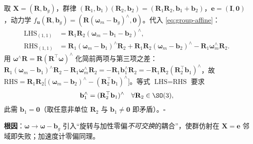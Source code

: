 \begin{derivation}
\label{deriv:bias-negative}
取 $\mathbf{X}=(\mathbf{R},\mathbf{b}_g)$，群律 $(\mathbf{R}_1,\mathbf{b}_1)(\mathbf{R}_2,\mathbf{b}_2)=(\mathbf{R}_1\mathbf{R}_2,\mathbf{b}_1+\mathbf{b}_2)$，$\mathbf{e}=(\mathbf{I},\mathbf{0})$，动力学 $f_{\mathbf{u}}(\mathbf{R},\mathbf{b}_g)=(\mathbf{R}(\boldsymbol{\omega}_m-\mathbf{b}_g)^\wedge,\mathbf{0})$。代入 \cref{eq:group-affine}：
\begin{align*}
  \text{LHS}_{(1,1)}&=\mathbf{R}_1\mathbf{R}_2(\boldsymbol{\omega}_m-\mathbf{b}_1-\mathbf{b}_2)^\wedge,\\
  \text{RHS}_{(1,1)}&=\mathbf{R}_1(\boldsymbol{\omega}_m-\mathbf{b}_1)^\wedge\mathbf{R}_2+\mathbf{R}_1\mathbf{R}_2(\boldsymbol{\omega}_m-\mathbf{b}_2)^\wedge-\mathbf{R}_1\boldsymbol{\omega}_m^\wedge\mathbf{R}_2.
\end{align*}
用 $\boldsymbol{\omega}^\wedge\mathbf{R}=\mathbf{R}(\mathbf{R}^\top\boldsymbol{\omega})^\wedge$ 化简前两项与第三项之差：$\mathbf{R}_1(\boldsymbol{\omega}_m-\mathbf{b}_1)^\wedge\mathbf{R}_2-\mathbf{R}_1\boldsymbol{\omega}_m^\wedge\mathbf{R}_2=-\mathbf{R}_1\mathbf{b}_1^\wedge\mathbf{R}_2=-\mathbf{R}_1\mathbf{R}_2(\mathbf{R}_2^\top\mathbf{b}_1)^\wedge$，故 $\text{RHS}=\mathbf{R}_1\mathbf{R}_2\big[(\boldsymbol{\omega}_m-\mathbf{b}_2)^\wedge-(\mathbf{R}_2^\top\mathbf{b}_1)^\wedge\big]$。等式 $\text{LHS}=\text{RHS}$ 要求
\begin{equation}
  \mathbf{b}_1^\wedge=(\mathbf{R}_2^\top\mathbf{b}_1)^\wedge\quad\forall\mathbf{R}_2\in\SO(3),
  \label{eq:bias-contradiction}
\end{equation}
此需 $\mathbf{b}_1=\mathbf{0}$（取任意非单位 $\mathbf{R}_2$ 与 $\mathbf{b}_1\neq\mathbf{0}$ 即矛盾）。$\square$
\end{derivation}

\noindent{}\textbf{根因}：$\boldsymbol{\omega}\to\boldsymbol{\omega}-\mathbf{b}_g$ 引入“旋转与加性零偏\emph{不可交换}的耦合”，使群仿射在 $\mathbf{X}=\mathbf{e}$ 邻域即失败；加速度计零偏同理。


